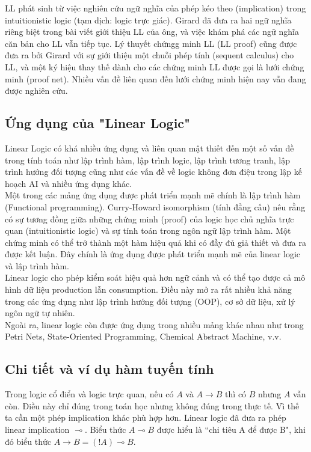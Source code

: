 \documentclass[a4paper]{article}
\begin{document}
LL phát sinh từ việc nghiên cứu ngữ nghĩa của phép kéo theo (implication) trong intuitionistic logic (tạm dịch: logic trực giác). Girard đã đưa ra hai ngữ nghĩa riêng biệt trong bài viết giới thiệu LL của ông, và việc khám phá các ngữ nghĩa căn bản cho LL vẫn tiếp tục. Lý thuyết chứngg minh LL (LL proof) cũng được đưa ra bởi Girard với sự giới thiệu một chuỗi phép tính (sequent calculus) cho LL, và một ký hiệu thay thế dành cho các chứng minh LL được gọi là lưới chứng minh (proof net). Nhiều vấn đề liên quan đến lưới chứng minh hiện nay vẫn đang được nghiên cứu.

\subsection{Ứng dụng của "Linear Logic"}
Linear Logic có khá nhiều ứng dụng và liên quan mật thiết đến một số vấn đề trong tính toán như lập trình hàm, lập trình logic, lập trình tương tranh, lập trình hướng đối tượng cũng như các vấn đề về logic không đơn điệu trong lập kế hoạch AI và nhiều ứng dụng khác.\\

Một trong các mảng ứng dụng được phát triển mạnh mẽ chính là lập trình hàm (Functional programming). Curry-Howard isomorphism (tính đẳng cấu) nêu rằng có sự tương đồng giữa những chứng minh (proof) của logic học chủ nghĩa trực quan (intuitionistic logic) và sự tính toán trong ngôn ngữ lập trình hàm. Một chứng minh có thể trở thành một hàm hiệu quả khi có đầy đủ giả thiết và đưa ra được kết luận. Đây chính là ứng dụng được phát triển mạnh mẽ của linear logic và lập trình hàm.\\

Linear logic cho phép kiểm soát hiệu quả hơn ngữ cảnh và có thể tạo được cả mô hình dữ liệu production lẫn consumption. Điều này mở ra rất nhiều khả năng trong các ứng dụng như lập trình hướng đối tượng (OOP), cơ sở dữ liệu, xử lý ngôn ngữ tự nhiên.\\

Ngoài ra, linear logic còn được ứng dụng trong nhiều mảng khác nhau như trong Petri Nets, State-Oriented Programming, Chemical Abstract Machine, v.v.

\subsection{Chi tiết và ví dụ hàm tuyến tính}
Trong logic cổ điển và logic trực quan, nếu có $A$ và $A \rightarrow  B$ thì có $B$ nhưng $A$ vẫn còn. Điều này chỉ đúng trong toán học nhưng không đúng trong thực tế. Vì thế ta cần một phép implication khác phù hợp hơn. Linear logic đã đưa ra phép linear implication $\multimap$. Biểu thức $A \multimap B$ được hiểu là “chi tiêu A để được B", khi đó biểu thức $A \rightarrow B = (!A) \multimap B$.\\
\end{document}
